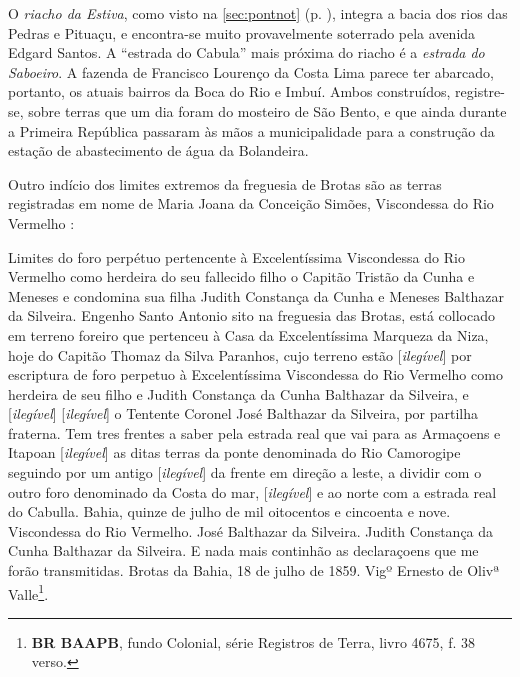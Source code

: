 O \textit{riacho da Estiva}, como visto na \autoref{sec:pontnot} (p. \pageref{sec:pontnot}), integra a bacia dos rios das Pedras e Pituaçu, e encontra-se muito provavelmente soterrado pela avenida Edgard Santos. A ``estrada do Cabula'' mais próxima do riacho é a \textit{estrada do Saboeiro}. A fazenda de Francisco Lourenço da Costa Lima parece ter abarcado, portanto, os atuais bairros da Boca do Rio e Imbuí. Ambos construídos, registre-se, sobre terras que um dia foram do mosteiro de São Bento, e que ainda durante a Primeira República passaram às mãos a municipalidade para a construção da estação de abastecimento de água da Bolandeira.

Outro indício dos limites extremos da freguesia de Brotas são as terras registradas em nome de Maria Joana da Conceição Simões, Viscondessa do Rio Vermelho \cite[p.~693]{zuquete_nobreza_1989}:

\begin{citacao}
Limites do foro perpétuo pertencente à Excelentíssima Viscondessa do Rio Vermelho como herdeira do seu fallecido filho o Capitão Tristão da Cunha e Meneses e condomina sua filha Judith Constança da Cunha e Meneses Balthazar da Silveira. Engenho Santo Antonio sito na freguesia das Brotas, está collocado em terreno foreiro que pertenceu à Casa da Excelentíssima Marqueza da Niza, hoje do Capitão Thomaz da Silva Paranhos, cujo terreno estão [\textit{ilegível}] por escriptura de foro perpetuo à Excelentíssima Viscondessa do Rio Vermelho como herdeira de seu filho e Judith Constança da Cunha Balthazar da Silveira, e [\textit{ilegível}] [\textit{ilegível}] o Tentente Coronel José Balthazar da Silveira, por partilha fraterna. Tem tres frentes a saber pela estrada real que vai para as Armaçoens e Itapoan [\textit{ilegível}] as ditas terras da ponte denominada do Rio Camorogipe seguindo por um antigo [\textit{ilegível}] da frente em direção a leste, a dividir com o outro foro denominado da Costa do mar, [\textit{ilegível}] e ao norte com a estrada real do Cabulla. Bahia, quinze de julho de mil oitocentos e cincoenta e nove. Viscondessa do Rio Vermelho. José Balthazar da Silveira. Judith Constança da Cunha Balthazar da Silveira. E nada mais continhão as declaraçoens que me forão transmitidas. Brotas da Bahia, 18 de julho de 1859. Vigº Ernesto de Olivª Valle\footnote{\textbf{BR BAAPB}, fundo Colonial, série Registros de Terra, livro 4675, f. 38 verso.}.
\end{citacao}

